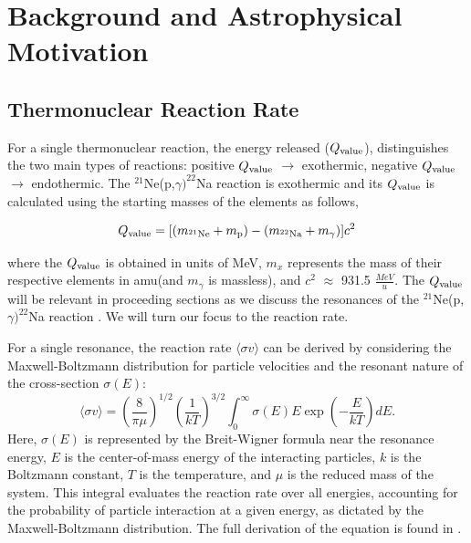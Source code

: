 \documentclass[a4paper,12pt]{article}
\def\reac{$^{21}$Ne(p,$\gamma)^{22}$Na reaction }
\def\Q{Q_{\rm{value}}}
\begin{document}
\section{Background and Astrophysical Motivation}\label{Background}

\subsection{Thermonuclear Reaction Rate}\label{therm}



For a single thermonuclear reaction, the energy released ($Q_{\rm{value}}$), distinguishes the two main types of reactions: positive $Q_{\rm{value}}$ $\rightarrow$ exothermic, negative $Q_{\rm{value}}$ $\rightarrow$ endothermic.  The \reac is exothermic and its $\Q$ is calculated using the starting masses of the elements as follows,

\begin{equation}
    \Q = [(m_{\rm{^{21}Ne}} + m_{\rm{p}}) - (m_{\rm{^{22}Na}}+m_{\rm{\gamma}})]c^2
\end{equation}

where the $\Q$ is obtained in units of MeV, $m_x$ represents the mass of their respective elements in amu(and $m_{\gamma}$ is massless), and $c^2$ $\approx$ 931.5 $\frac{MeV}{u}$. The $\Q$ will be relevant in proceeding sections as we discuss the resonances of the \reac.  We will turn our focus to the reaction rate.    

For a single resonance, the reaction rate \(\langle \sigma v \rangle\) can be derived by considering the Maxwell-Boltzmann distribution for particle velocities and the resonant nature of the cross-section \(\sigma(E)\):
\begin{equation}
\langle \sigma v \rangle = \left( \frac{8}{\pi \mu} \right)^{1/2} \left( \frac{1}{kT} \right)^{3/2} \int_0^\infty \sigma(E) E \exp \left( -\frac{E}{kT} \right) dE.
\end{equation}
Here, \(\sigma(E)\) is represented by the Breit-Wigner formula near the resonance energy, \(E\) is the center-of-mass energy of the interacting particles, \(k\) is the Boltzmann constant, \(T\) is the temperature, and \(\mu\) is the reduced mass of the system. This integral evaluates the reaction rate over all energies, accounting for the probability of particle interaction at a given energy, as dictated by the Maxwell-Boltzmann distribution.  The full derivation of the equation is found in \citealp{RolfsRodney1988}.
\end{document}
